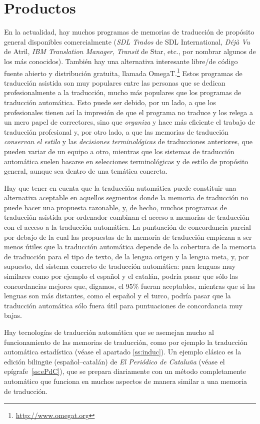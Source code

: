 \section{Productos} 

En la actualidad, hay muchos programas de memorias de traducción de propósito general disponibles comercialmente (\emph{SDL Trados} de SDL International, \emph{Déjà Vu} de Atril, \emph{IBM Translation Manager}, \emph{Transit} de Star, etc., por nombrar algunos de los más conocidos). También hay una alternativa interesante libre/de código fuente abierto y distribución gratuita, llamada OmegaT.\footnote{\url{http://www.omegat.org}} Estos programas de traducción asistida son muy populares entre las personas que se dedican profesionalmente a la traducción, mucho más populares que los programas de traducción automática. Esto puede ser debido, por un lado, a que los profesionales tienen así la impresión de que el programa no traduce y los relega a un mero papel de correctores, sino que \emph{organiza} y hace más eficiente el trabajo de traducción profesional y, por otro lado, a que las memorias de traducción \emph{conservan el estilo} y las \emph{decisiones terminológicas} de traducciones anteriores, que pueden variar de un equipo a otro, mientras que los sistemas de traducción automática suelen basarse en selecciones terminológicas y de estilo de propósito general, aunque sea dentro de una temática concreta. 

Hay que tener en cuenta que la traducción automática puede constituir una alternativa aceptable en aquellos segmentos donde la memoria de traducción no puede hacer una propuesta razonable, y, de hecho, muchos programas de traducción asistida por ordenador combinan el acceso a memorias de traducción con el acceso a la traducción automática. La puntuación de concordancia parcial por debajo de la cual las propuestas de la memoria de traducción empiezan a ser menos útiles que la traducción automática depende de la cobertura de la memoria de traducción para el tipo de texto, de la lengua origen y la lengua meta, y, por supuesto, del sistema concreto de traducción automática: para lenguas muy similares como por ejemplo el español y el catalán, podría pasar que sólo las concordancias mejores que, digamos, el 95\% fueran aceptables, mientras que si las lenguas son más distantes, como el español y el turco, podría pasar que la traducción automática sólo fuera útil para puntuaciones de concordancia muy bajas. 

Hay tecnologías de traducción automática que se asemejan mucho al funcionamiento de las memorias de traducción, como por ejemplo la traducción automática estadística (véase el apartado \ref{ss:induc}). Un ejemplo clásico es la edición bilingüe (español--catalán) de \emph{El Periódico de Cataluña} (véase el epígrafe~\ref{ss:ePdC}), que se prepara diariamente con un método completamente automático que funciona en muchos aspectos de manera similar a una memoria de traducción. 

